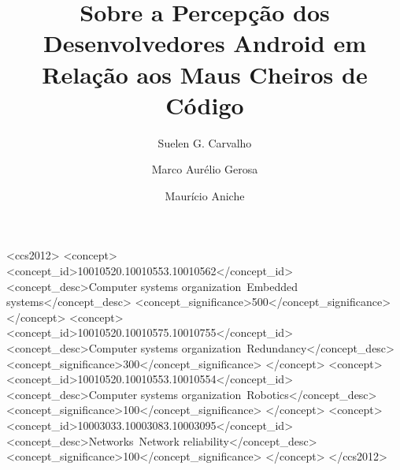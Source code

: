 \documentclass[sigconf]{acmart}
\begin{document}
\title{Sobre a Percep\c{c}\~ao dos Desenvolvedores Android em Rela\c{c}\~ao aos Maus Cheiros de C\'odigo}


\author{Suelen G. Carvalho}

\author{Marco Aur\'elio Gerosa}

\author{Maur\'icio Aniche}



\begin{abstract}

\end{abstract}

%
%
\begin{CCSXML}
<ccs2012>
 <concept>
  <concept_id>10010520.10010553.10010562</concept_id>
  <concept_desc>Computer systems organization~Embedded systems</concept_desc>
  <concept_significance>500</concept_significance>
 </concept>
 <concept>
  <concept_id>10010520.10010575.10010755</concept_id>
  <concept_desc>Computer systems organization~Redundancy</concept_desc>
  <concept_significance>300</concept_significance>
 </concept>
 <concept>
  <concept_id>10010520.10010553.10010554</concept_id>
  <concept_desc>Computer systems organization~Robotics</concept_desc>
  <concept_significance>100</concept_significance>
 </concept>
 <concept>
  <concept_id>10003033.10003083.10003095</concept_id>
  <concept_desc>Networks~Network reliability</concept_desc>
  <concept_significance>100</concept_significance>
 </concept>
</ccs2012>  
\end{CCSXML}
\end{document}
